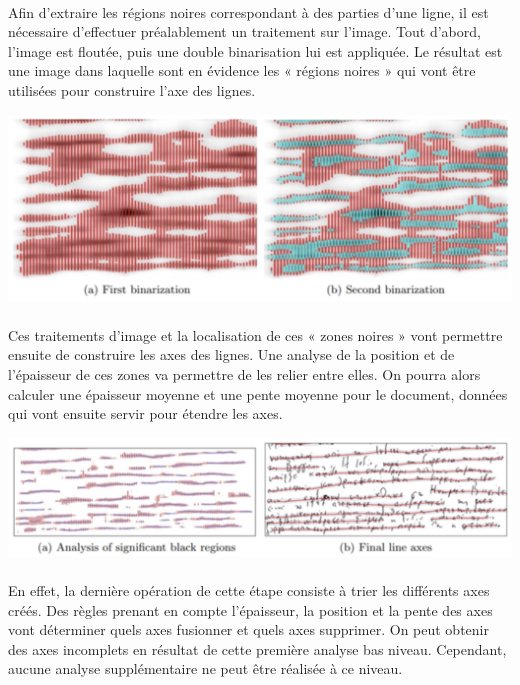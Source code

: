 \paragraph{}
Afin d'extraire les régions noires correspondant à des parties d'une ligne, il est nécessaire d'effectuer préalablement un
traitement sur l'image. Tout d'abord, l'image est floutée, puis une double binarisation lui est appliquée. Le résultat est
une image dans laquelle sont en évidence les « régions noires » qui vont être utilisées pour construire l'axe des lignes.

\begin{mdframed}[innerbottommargin=10]
\begin{center}
\includegraphics[width=0.6\linewidth]{detect2.png}
\end{center}
\end{mdframed}

\paragraph{}
Ces traitements d'image et la localisation de ces « zones noires » vont permettre ensuite de construire les axes des lignes.
Une analyse de la position et de l'épaisseur de ces zones va permettre de les relier entre elles. On pourra alors calculer
une épaisseur moyenne et une pente moyenne pour le document, données qui vont ensuite servir pour étendre les axes.

\begin{mdframed}[innerbottommargin=10]
\begin{center}
\includegraphics[width=0.6\linewidth]{detect3.png}
\end{center}
\end{mdframed}

\paragraph{}
En effet, la dernière opération de cette étape consiste à trier les différents axes créés. Des règles prenant en compte l'épaisseur,
la position et la pente des axes vont déterminer quels axes fusionner et quels axes supprimer. On peut obtenir des axes incomplets
en résultat de cette première analyse bas niveau. Cependant, aucune analyse supplémentaire ne peut être réalisée à ce niveau.

